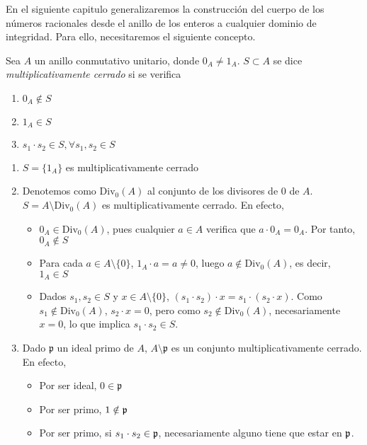 \documentclass[../main.tex]{subfiles}
\begin{document}
	En el siguiente capitulo generalizaremos la construcción del cuerpo de los números racionales desde el anillo de los enteros a cualquier dominio de integridad. Para ello, necesitaremos el siguiente concepto.
	\begin{definition}
		Sea $A$ un anillo conmutativo unitario, donde $0_A\neq 1_A$. $S\subset A$ se dice \textit{multiplicativamente cerrado} si se verifica \begin{enumerate}
			\item $0_A\notin S$
			\item $1_A\in S$
			\item $s_1\cdot s_2\in S, \forall s_1,s_2\in S$
		\end{enumerate}
	\end{definition}
	\begin{example}
		\begin{enumerate}
			\item $S=\{1_A\}$ es multiplicativamente cerrado
			\item Denotemos como $\operatorname{Div_0}(A)$ al conjunto de los divisores de $0$ de $A$. $S=A\setminus \operatorname{Div_0}(A)$ es multiplicativamente cerrado. En efecto, \begin{itemize}
				\item $0_A\in \operatorname{Div_0}(A)$, pues cualquier $a\in A$ verifica que $a\cdot 0_A=0_A$. Por tanto, $0_A\notin S$
				\item Para cada $a\in A\setminus\{0\}$, $1_A\cdot a=a\neq 0$, luego $a\notin \operatorname{Div_0}(A)$, es decir, $1_A\in S$
				\item Dados $s_1,s_2\in S$ y $x\in A\setminus\{0\}$, $(s_1\cdot s_2)\cdot x=s_1\cdot(s_2\cdot x)$. Como $s_1\notin \operatorname{Div_0}(A)$, $s_2\cdot x=0$, pero como $s_2\notin \operatorname{Div_0}(A)$, necesariamente $x=0$, lo que implica $s_1\cdot s_2\in S$.
			\end{itemize}
			\item Dado $\mathfrak{p}$ un ideal primo de $A$, $A\setminus\mathfrak{p}$ es un conjunto multiplicativamente cerrado. En efecto, \begin{itemize}
				\item Por ser ideal, $0\in\mathfrak{p}$
				\item Por ser primo, $1\notin\mathfrak{p}$
				\item Por ser primo, si $s_1\cdot s_2\in\mathfrak{p}$, necesariamente alguno tiene que estar en $\mathfrak{p}$.
			\end{itemize}
		\end{enumerate}
	\end{example}
\end{document}
